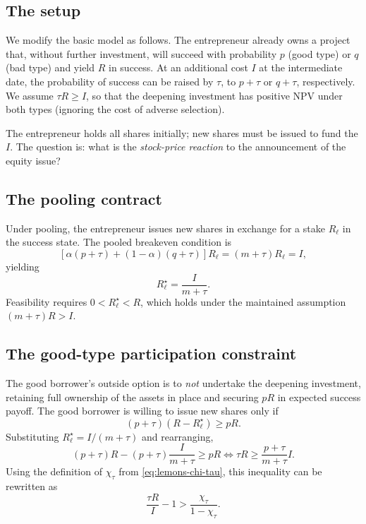 \documentclass[11pt,a4paper,oneside]{book}
\def\geq{\geqslant}
\theoremstyle{plain}
\theoremstyle{definition}
\theoremstyle{remark}
\numberwithin{equation}{chapter}
\begin{document}
\subsection{The setup}

We modify the basic model as follows.
The entrepreneur already owns a project that, without further investment, will succeed with probability $p$ (good type) or $q$ (bad type) and yield $R$ in success.
At an additional cost $I$ at the intermediate date, the probability of success can be raised by $\tau$, to $p + \tau$ or $q + \tau$, respectively.
We assume $\tau R \geq I$, so that the deepening investment has positive NPV under both types (ignoring the cost of adverse selection).

The entrepreneur holds all shares initially; new shares must be issued to fund the $I$.
The question is: what is the \emph{stock-price reaction} to the announcement of the equity issue?

\subsection{The pooling contract}

Under pooling, the entrepreneur issues new shares in exchange for a stake $R_\ell$ in the success state.
The pooled breakeven condition is
\begin{equation}\label{eq:lemons-sprr-breakeven}
  [\alpha(p + \tau) + (1 - \alpha)(q + \tau)] R_\ell = (m + \tau) R_\ell = I,
\end{equation}
yielding
\begin{equation}\label{eq:lemons-sprr-Rstar}
  R_\ell^\star = \frac{I}{m + \tau}.
\end{equation}
Feasibility requires $0 < R_\ell^\star < R$, which holds under the maintained assumption $(m + \tau) R > I$.

\subsection{The good-type participation constraint}

The good borrower's outside option is to \emph{not} undertake the deepening investment, retaining full ownership of the assets in place and securing $pR$ in expected success payoff.
The good borrower is willing to issue new shares only if
\begin{equation}\label{eq:lemons-sprr-good-IC}
  (p + \tau)(R - R_\ell^\star) \geq pR.
\end{equation}
Substituting $R_\ell^\star = I/(m + \tau)$ and rearranging,
\begin{equation*}
  (p + \tau) R - (p + \tau) \frac{I}{m + \tau} \geq pR
  \Longleftrightarrow
  \tau R \geq \frac{p + \tau}{m + \tau} I.
\end{equation*}
Using the definition of $\chi_\tau$ from \eqref{eq:lemons-chi-tau}, this inequality can be rewritten as
\begin{equation}\label{eq:lemons-sprr-pooling}
  \frac{\tau R}{I} - 1 > \frac{\chi_\tau}{1 - \chi_\tau}.
\end{equation}
\end{document}

